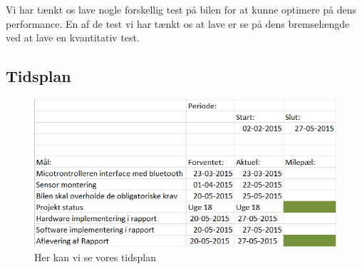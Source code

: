 Vi har tænkt os lave nogle forskellig test på bilen for at kunne optimere på dens performance. En af de test vi har tænkt os at lave er se på dens bremselængde ved at lave en kvantitativ test.


\subsection{Tidsplan}

\begin{figure}[h]
	\centering
		\includegraphics[scale=0.75]{Billeder/Tidsplan.PNG}
	\caption{Her kan vi se vores tidsplan}
	\label{fig:tidsplan}
\end{figure}